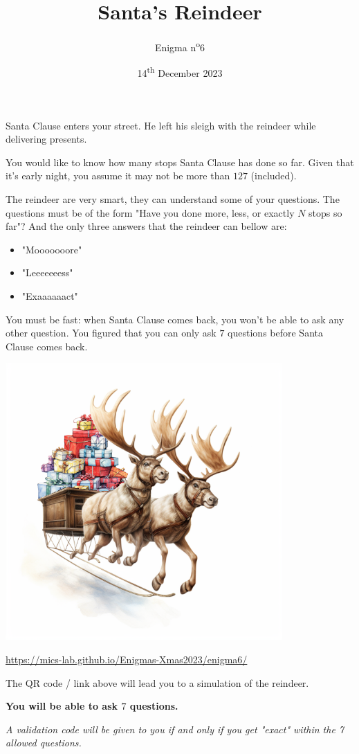 \documentclass[a4paper, top=10mm]{article}
\title{\textbf{\huge{Santa's Reindeer}}}
\author{Enigma n\textsuperscript{o}6}
\date{14\textsuperscript{th} December 2023}
\begin{document}
	\maketitle
	
	Santa Clause enters your street.
	He left his sleigh with the reindeer while delivering presents.
	
	You would like to know how many stops Santa Clause has done so far.
	Given that it's early night, you assume it may not be more than $127$ (included).
	
	The reindeer are very smart, they can understand some of your questions.
	The questions must be of the form "Have you done more, less, or exactly $N$ stops so far"?
	And the only three answers that the reindeer can bellow are:
	\begin{itemize}
		\item "Mooooooore"
		\item "Leeeeeeess"
		\item "Exaaaaaact"
	\end{itemize}
	You must be fast: when Santa Clause comes back, you won't be able to ask any other question.
	You figured that you can only ask $7$ questions before Santa Clause comes back.
	
	\begin{center}
		\includegraphics[height=300pt]{06sleigh_with_presents.png}
		
		\url{https://mics-lab.github.io/Enigmas-Xmas2023/enigma6/}
	\end{center}
	
	The QR code / link above will lead you to a simulation of the reindeer.
	
	\textbf{You will be able to ask $7$ questions.}
	
	\textit{A validation code will be given to you if and only if you get "exact" within the 7 allowed questions.}
	
\end{document}
